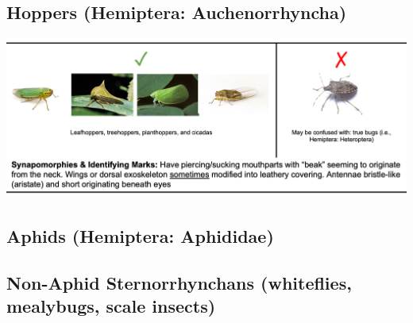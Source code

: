 \documentclass[
  letterpaper,
  DIV=11,
  numbers=noendperiod]{scrreprt}
\begin{document}
\subsection{Hoppers (Hemiptera:
Auchenorrhyncha)}\label{hoppers-hemiptera-auchenorrhyncha}

\includegraphics{protocols/images/img25.png}

\subsection{Aphids (Hemiptera:
Aphididae)}\label{aphids-hemiptera-aphididae}

\begin{figure}


\caption{\label{fig-herbvivores4}}

\end{figure}%

\subsection{Non-Aphid Sternorrhynchans (whiteflies, mealybugs, scale
insects)}\label{non-aphid-sternorrhynchans-whiteflies-mealybugs-scale-insects}
\end{document}
